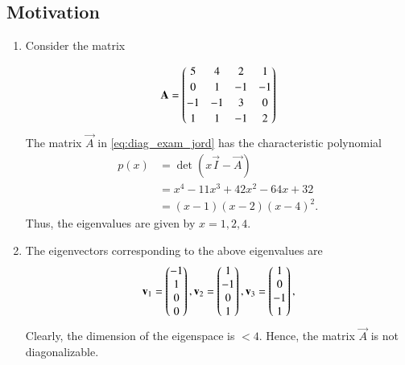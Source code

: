 \subsection{Motivation}
\renewcommand{\theequation}{\theenumi}
\renewcommand{\thefigure}{\theenumi}
\begin{enumerate}[label=\thesection.\arabic*.,ref=\thesection.\theenumi]

\item Consider the matrix

\begin{align}
\mathbf{A} = 
\begin{pmatrix}
  5 &  4 &  2 &  1 \\[2pt]
  0 &  1 & -1 & -1 \\[2pt]
 -1 & -1 &  3 &  0 \\[2pt]
  1 &  1 & -1 &  2
\end{pmatrix}
\label{eq:diag_exam_jord}
\end{align}
%
%
%
The matrix $\vec{A}$ in \eqref{eq:diag_exam_jord} has the characteristic polynomial
\begin{align} 
p(x) & = \det(x \vec{I} - \vec{A}) \\ &  = x^4 - 11 x^3 + 42 x^2 - 64 x + 32  \\ & = (x-1)(x-2)(x-4)^2. \, 
\end{align}
Thus, the eigenvalues are given by $x = 1,2,4$.
\item The eigenvectors corresponding to the above eigenvalues are
\begin{align} 
\mathbf{v}_1 = \begin{pmatrix}-1\\ 1\\ 0\\ 0\end{pmatrix}, 
\mathbf{v}_2 = \begin{pmatrix}1\\ -1\\ 0\\ 1\end{pmatrix}, 
\mathbf{v}_3 = \begin{pmatrix}1\\ 0\\ -1\\ 1\end{pmatrix}, 
\end{align}
Clearly, the dimension of the eigenspace is $< 4$.  Hence, the matrix $\vec{A}$ is not diagonalizable.
\end{enumerate}
